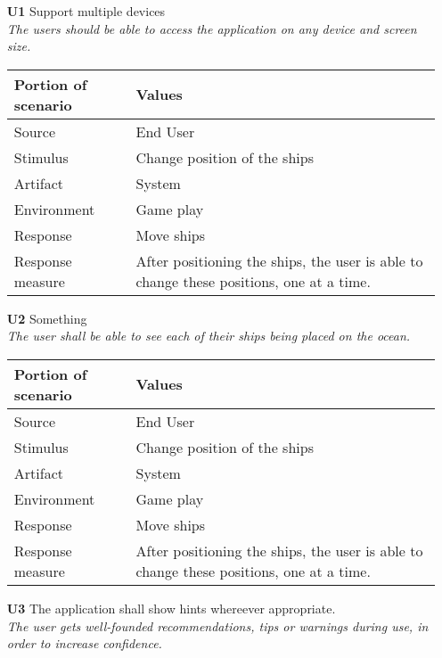 \begin{itemize}
    \item[\textbf{U1}] Support multiple devices \\
    \textit{\small{The users should be able to access the application on any device and screen size.}}
        
    \begin{tabular}{| l | p{7cm} |}
        \hline
        \rowcolor[gray]{0.8}
        \textbf{Portion of scenario} & \textbf{Values} \\
        \hline
        Source & End User \\
        Stimulus & Change position of the ships \\
        Artifact & System \\
        Environment & Game play \\
        Response & Move ships  \\
        Response measure    & After positioning the ships, the user is able to change these positions, one  at a time. \\
        \hline
    \end{tabular}

    \item[\textbf{U2}] Something \\
    \textit{\small{The user shall be able to see each of their ships being placed on the ocean.}}
        
    \begin{tabular}{| l | p{7cm} |}
        \hline
        \rowcolor[gray]{0.8}
        \textbf{Portion of scenario} & \textbf{Values} \\
        \hline
        Source & End User \\
        Stimulus & Change position of the ships \\
        Artifact & System \\
        Environment & Game play \\
        Response & Move ships  \\
        Response measure & After positioning the ships, the user is able to change these positions, one  at a time. \\
        \hline
    \end{tabular}

    \item[\textbf{U3}] The application shall show hints whereever appropriate. \\
        \textit{\small{The user gets well-founded recommendations, tips or warnings during use, in order to increase confidence.}}
        

\end{itemize}
